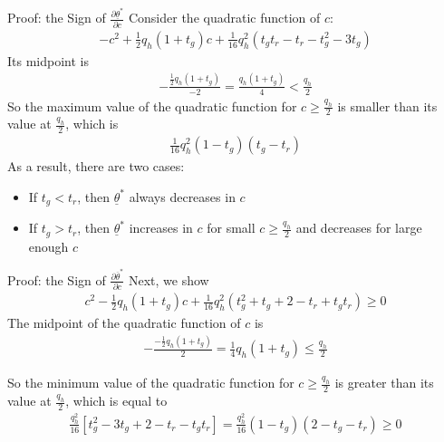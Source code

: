 \documentclass[9pt,aspectratio=1610]{beamer}
\begin{document}
\begin{frame}{Proof: the Sign of $\frac{\partial \underline{\theta}^*}{\partial c}$}\label{proof_partial_c}
Consider the quadratic function of $c$:
\begin{align*}
     -c^2 + \frac{1}{2}q_h(1+t_g)c + \frac{1}{16}q_h^2(t_gt_r-t_r-t_g^2-3t_g)
\end{align*}
Its midpoint is 
\begin{align*}
    -\frac{\frac{1}{2}q_h(1+t_g)}{-2} = \frac{q_h(1+t_g)}{4}<\frac{q_h}{2}
\end{align*}
So the maximum value of the quadratic function for $c\geq \frac{q_h}{2}$ is smaller than its value at $\frac{q_h}{2}$, which is
\begin{align*}
    \frac{1}{16}q_h^2(1-t_g)(t_g-t_r)
\end{align*}
As a result, there are two cases:
\begin{itemize}
    \item If $t_g< t_r$, then $\underline{\theta}^*$ always decreases in $c$
    \item If $t_g>t_r$, then $\underline{\theta}^*$ increases in $c$ for small $c\geq \frac{q_h}{2}$ and decreases for large enough $c$
\end{itemize}
\end{frame}

\begin{frame}{Proof: the Sign of $\frac{\partial \overline{\theta}^*}{\partial c}$}
Next, we show 
\begin{align*}
    c^2-\frac{1}{2}q_h(1+t_g)c + \frac{1}{16}q_h^2(t_g^2+t_g+2-t_r+t_gt_r)\geq 0
\end{align*}
The midpoint of the quadratic function of $c$ is
\begin{align*}
    -\frac{-\frac{1}{2}q_h(1+t_g)}{2} = \frac{1}{4}q_h(1+t_g)\leq\frac{q_h}{2}
\end{align*}

So the minimum value of the quadratic function for $c\geq \frac{q_h}{2}$ is greater than its value at $\frac{q_h}{2}$, which is equal to
\begin{align*}
    \frac{q_h^2}{16}[t_g^2-3t_g+2-t_r-t_gt_r] = \frac{q_h^2}{16}(1-t_g)(2-t_g-t_r)\geq 0
\end{align*}
\vspace{1em}
\hyperlink{partial_c}{}
\end{frame}
\end{document}
